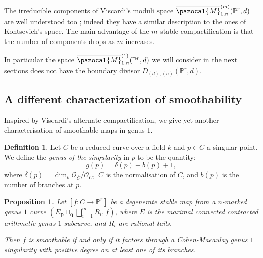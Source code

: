\documentclass[11pt]{amsart}
\newcommand{\PP}{\mathbb P}
\newcommand{\OO}{\mathcal O}
\renewcommand{\to}{\rightarrow}
\theoremstyle{plain}
\newtheorem{prop}[thm]{Proposition}
\newtheorem{cor}[thm]{Corollary}
\theoremstyle{definition}
\newtheorem{dfn}[thm]{Definition}
\begin{document}
The irreducible components of Viscardi's moduli space $\overline{\pazocal{M}}^{(m)}_{1,n}(\PP^r,d)$ are well understood too \cite[Thm.~5.9]{VISC}; indeed they have a similar description to the ones of Kontsevich's space. The main advantage of the $m$-stable compactification is that the number of components drops as $m$ increases.

In particular the space $\overline{\pazocal{M}}^{(1)}_{1,n}(\PP^r,d)$ we will consider in the next sections does not have the boundary divisor $D_{(d),(n)}(\PP^r,d).$
 
 \subsection{A different characterization of smoothability}
 Inspired by Viscardi's alternate compactification, we give yet another characterisation of smoothable maps in genus $1.$
 \begin{dfn}
 Let $C$ be a reduced curve over a field $k$ and $p\in C$ a singular point. We define the \emph{genus of the singularity} in $p$ to be the quantity: $$g(p)=\delta(p)-b(p)+1,$$ where $\delta(p)=\dim_k\OO_{\overline C}/\OO_C,$ $\overline{C}$ is the normalisation of $C$, and $b(p)$ is the number of branches at $p.$
 \end{dfn}
 \begin{prop}\label{prop:smoothability2}
 Let $[f\colon C\to \PP^r]$ be a degenerate stable map from a $n$-marked genus $1$ curve $(E {}_{\mathbf p}\!\sqcup_{\mathbf q}\bigsqcup_{i=1}^m R_i,f)$, where $E$ is the maximal connected contracted arithmetic genus $1$ subcurve, and $R_i$ are rational tails. 
  
  Then $f$ is smoothable if and only if it factors through a Cohen-Macaulay genus $1$ singularity with positive degree on at least one of its branches.
\end{prop}
\end{document}
